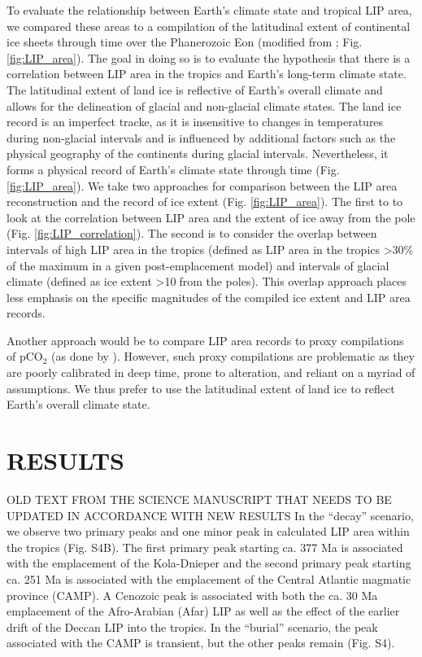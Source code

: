 \documentclass[11pt,letterpaper]{article}
\begin{document}
To evaluate the relationship between Earth's climate state and tropical LIP area, we compared these areas to a compilation of the latitudinal extent of continental ice sheets through time over the Phanerozoic Eon (modified from \citealp{Royer2004a}; Fig. \ref{fig:LIP_area}). The goal in doing so is to evaluate the hypothesis that there is a correlation between LIP area in the tropics and Earth's long-term climate state. The latitudinal extent of land ice is reflective of Earth's overall climate and allows for the delineation of glacial and non-glacial climate states. The land ice record is an imperfect tracke, as it is insensitive to changes in temperatures during non-glacial intervals and is influenced by additional factors such as the physical geography of the continents during glacial intervals. Nevertheless, it forms a physical record of Earth's climate state through time (Fig. \ref{fig:LIP_area}). We take two approaches for comparison between the LIP area reconstruction and the record of ice extent (Fig. \ref{fig:LIP_area}). The first to to look at the correlation between LIP area and the extent of ice away from the pole (Fig. \ref{fig:LIP_correlation}). The second is to consider the overlap between intervals of high LIP area in the tropics (defined as LIP area in the tropics \textgreater30\% of the maximum in a given post-emplacement model) and intervals of glacial climate (defined as ice extent \textgreater10\textdegree $\;$from the poles). This overlap approach places less emphasis on the specific magnitudes of the compiled ice extent and LIP area records.

Another approach would be to compare LIP area records to proxy compilations of pCO$_2$ (as done by \citealp{Johansson2018a}). However, such proxy compilations are problematic as they are poorly calibrated in deep time, prone to alteration, and reliant on a myriad of assumptions. We thus prefer to use the latitudinal extent of land ice to reflect Earth's overall climate state.

\section*{RESULTS}

OLD TEXT FROM THE SCIENCE MANUSCRIPT THAT NEEDS TO BE UPDATED IN ACCORDANCE WITH NEW RESULTS
In the “decay” scenario, we observe two primary peaks and one minor peak in calculated LIP area within the tropics (Fig. S4B). The first primary peak starting ca. 377 Ma is associated with the emplacement of the Kola-Dnieper and the second primary peak starting ca. 251 Ma is associated with the emplacement of the Central Atlantic magmatic province (CAMP). A Cenozoic peak is associated with both the ca. 30 Ma emplacement of the Afro-Arabian (Afar) LIP as well as the effect of the earlier drift of the Deccan LIP into the tropics. In the “burial” scenario, the peak associated with the CAMP is transient, but the other peaks remain (Fig. S4).
\end{document}
